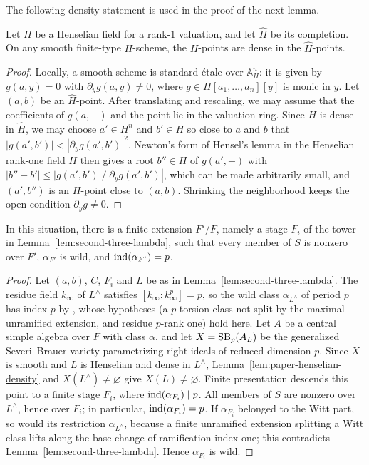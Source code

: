 The following density statement is used in the proof of the next lemma.

\begin{lemma}\label{lem:paper-henselian-density}
Let $H$ be a Henselian field for a rank-$1$ valuation, and let $\widehat H$ be its completion.
On any smooth finite-type $H$-scheme, the $H$-points are dense in the $\widehat H$-points.
\end{lemma}
\begin{proof}
Locally, a smooth scheme is standard \'etale over $\mathbb A^n_H$: it is given by $g(a,y)=0$ with $\partial_yg(a,y)\ne0$, where $g\in H[a_1,\dots,a_n][y]$ is monic in $y$.
Let $(a,b)$ be an $\widehat H$-point.
After translating and rescaling, we may assume that the coefficients of $g(a,-)$ and the point lie in the valuation ring.
Since $H$ is dense in $\widehat H$, we may choose $a'\in H^n$ and $b'\in H$ so close to $a$ and $b$ that $|g(a',b')|<|\partial_yg(a',b')|^2$.
Newton's form of Hensel's lemma in the Henselian rank-one field $H$ then gives a root $b''\in H$ of $g(a',-)$ with $|b''-b'|\le|g(a',b')|/|\partial_yg(a',b')|$, which can be made arbitrarily small, and $(a',b'')$ is an $H$-point close to $(a,b)$.
Shrinking the neighborhood keeps the open condition $\partial_yg\ne0$.
\end{proof}

\begin{lemma}\label{lem:second-three-wild-descent}
In this situation, there is a finite extension $F'/F$, namely a stage $F_i$ of the tower in Lemma~\ref{lem:second-three-lambda}, such that every member of $S$ is nonzero over $F'$, $\alpha_{F'}$ is wild, and $\operatorname{ind}(\alpha_{F'})=p$.
\end{lemma}
\begin{proof}
Let $(a,b)$, $C$, $F_i$ and $L$ be as in Lemma~\ref{lem:second-three-lambda}.
The residue field $k_\infty$ of $L^\wedge$ satisfies $[k_\infty:k_\infty^p]=p$, so the wild class $\alpha_{L^\wedge}$ of period $p$ has index $p$ by \cite[\S4, Lemma 5, p.~337]{KatoLocalI}, whose hypotheses (a $p$-torsion class not split by the maximal unramified extension, and residue $p$-rank one) hold here.
Let $A$ be a central simple algebra over $F$ with class $\alpha$, and let $X=\operatorname{SB}_p(A_L)$ be the generalized Severi--Brauer variety parametrizing right ideals of reduced dimension $p$.
Since $X$ is smooth and $L$ is Henselian and dense in $L^\wedge$, Lemma~\ref{lem:paper-henselian-density} and $X(L^\wedge)\ne\varnothing$ give $X(L)\ne\varnothing$.
Finite presentation descends this point to a finite stage $F_i$, where $\operatorname{ind}(\alpha_{F_i})\mid p$.
All members of $S$ are nonzero over $L^\wedge$, hence over $F_i$; in particular, $\operatorname{ind}(\alpha_{F_i})=p$.
If $\alpha_{F_i}$ belonged to the Witt part, so would its restriction $\alpha_{L^\wedge}$, because a finite unramified extension splitting a Witt class lifts along the base change of ramification index one; this contradicts Lemma~\ref{lem:second-three-lambda}.
Hence $\alpha_{F_i}$ is wild.
\end{proof}

